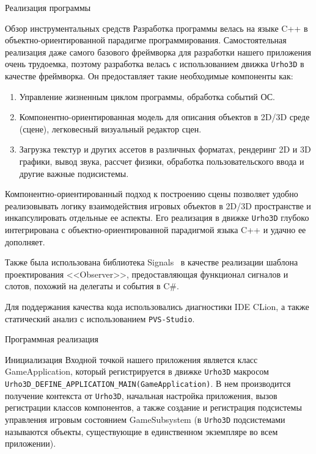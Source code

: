\documentclass[a4paper, 14pt]{extarticle}
\numberwithin{equation}{section} %
\begin{document}
\begin{section}{Реализация программы}
\begin{subsection}{Обзор инструментальных средств}
Разработка программы велась на языке C++ в объектно-ориентированной парадигме программирования.
Самостоятельная реализация даже самого базового фреймворка для разработки нашего приложения очень трудоемка, поэтому разработка велась с использованием движка \verb|Urho3D| в качестве фреймворка.
Он предоставляет такие необходимые компоненты как:
\begin{enumerate}
\item Управление жизненным циклом программы, обработка событий ОС.
\item Компонентно-ориентированная модель для описания объектов в 2D/3D среде (сцене), легковесный визуальный редактор сцен.
\item Загрузка текстур и других ассетов в различных форматах, рендеринг 2D и 3D графики, вывод звука, рассчет физики, обработка пользовательского ввода и другие важные подисистемы.
\end{enumerate}

Компонентно-ориентированный подход к построению сцены позволяет удобно реализовывать логику взаимодействия игровых объектов в 2D/3D пространстве и инкапсулировать отдельные ее аспекты.
Его реализация в движке \verb|Urho3D| глубоко интегрирована с объектно-ориентированной парадигмой языка C++ и удачно ее дополняет.

Также была использована библиотека Signals~\cite{signals} в качестве реализации шаблона проектирования <<Observer>>, предоставляющая функционал сигналов и слотов, похожий на делегаты и события в C\#.

Для поддержания качества кода использовались диагностики IDE CLion, а также статический анализ с использованием \verb|PVS-Studio|.
\end{subsection}

\begin{subsection}{Программная реализация}
\begin{subsubsection}{Инициализация}
Входной точкой нашего приложения является класс GameApplication, который регистрируется в движке \verb|Urho3D| макросом \verb|Urho3D_DEFINE_APPLICATION_MAIN(GameApplication)|.
В нем производится получение контекста от \verb|Urho3D|, начальная настройка приложения, вызов регистрации классов компонентов, а также создание и регистрация подсистемы управления игровым состоянием GameSubsystem (в \verb|Urho3D| подсистемами называются объекты, существующие в единственном экземпляре во всем приложении).


\end{subsubsection}
\end{subsection}
\end{section}
\end{document}
